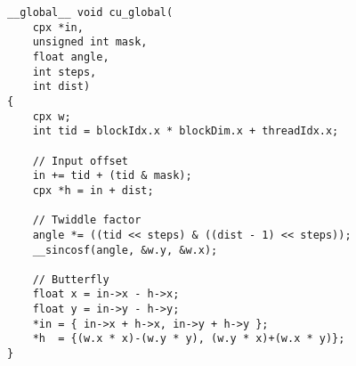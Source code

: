 \begin{lstlisting}
__global__ void cu_global(
    cpx *in,
    unsigned int mask,
    float angle,
    int steps,
    int dist)
{
    cpx w;
    int tid = blockIdx.x * blockDim.x + threadIdx.x;
    
    // Input offset
    in += tid + (tid & mask);
    cpx *h = in + dist;
    
    // Twiddle factor
    angle *= ((tid << steps) & ((dist - 1) << steps));
    __sincosf(angle, &w.y, &w.x);    
        
    // Butterfly
    float x = in->x - h->x;
    float y = in->y - h->y;
    *in = { in->x + h->x, in->y + h->y };
    *h  = {(w.x * x)-(w.y * y), (w.y * x)+(w.x * y)};
}
\end{lstlisting}